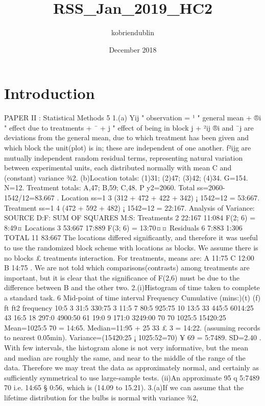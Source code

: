 \documentclass{article}
\title{RSS_Jan_2019_HC2}
\author{kobriendublin }
\date{December 2018}
\begin{document}
\maketitle

\section{Introduction}
PAPER II : Statistical Methods
5
1.(a) Yij
"
observation
= ¹
"
general mean
+ ®i
"
effect
due to
treatments
+ ¯ + j
"
effect of
being in
block j
+ ²ij
®i and ¯j are deviations from the general mean, due to which treatment has been given and
which block the unit(plot) is in; these are independent of one another.
f²ijg are mutually independent random residual terms, representing natural variation between
experimental units, each distributed normally with mean C and (constant) variance ¾2.
(b)Location totals: (1)31; (2)47; (3)42; (4)34. G=154. N=12.
Treatment totals: A,47; B,59; C,48.
P
y2=2060.
Total ss=2060-1542/12=83.667 .
Location ss=1
3 (312 + 472 + 422 + 342) ¡ 1542=12 = 53:667.
Treatment ss=1
4 (472 + 592 + 482) ¡ 1542=12 = 22:167.
Analysis of Variance:
SOURCE D:F: SUM OF SQUARES M:S:
Treatments 2 22:167 11:084 F(2; 6) = 8:49¤
Locations 3 53:667 17:889 F(3; 6) = 13:70¤¤
Residuals 6 7:883 1:306
TOTAL 11 83:667
The locations differed significantly, and therefore it was useful to use the randomized block scheme
with locations as blocks. We assume there is no blocks £ treatments interaction.
For treatments, means are: A 11:75
C 12:00
B 14:75
. We are not told which comparisons(contrasts) among
treatments are important, but it is clear that the significance of F(2,6) must be due to the difference
between B and the other two.
2.(i)Histogram of time taken to complete a standard task.
6
Mid-point of
time interval Frequency Cumulative
(mins:)(t) (f) ft ft2 frequency
10:5 3 31:5 330:75 3
11:5 7 80:5 925:75 10
13:5 33 445:5 6014:25 43
16:5 18 297:0 4900:50 61
19:0 9 171:0 3249:00 70
70 1025:5 15420:25
Mean=1025:5
70 = 14:65.
Median=11:95 + 25
33 £ 3 = 14:22.
(assuming records to nearest 0.05min).
Variance=(15420:25 ¡ 1025:52=70) ¥ 69 = 5:7489. SD=2.40 .
With few intervals, the histogram alone is not very informative, but the mean and median are
roughly the same, and near to the middle of the range of the data. Therefore we may treat the
data as approximately normal, and certainly as sufficiently symmetrical to use large-sample tests.
(ii)An approximate 95%
q
5:7489
70 i.e. 14:65 § 0:56, which is
(14.09 to 15.21).
3.(a)If we can assume that the lifetime distribution for the bulbs is normal with variance ¾2,
\end{document}
